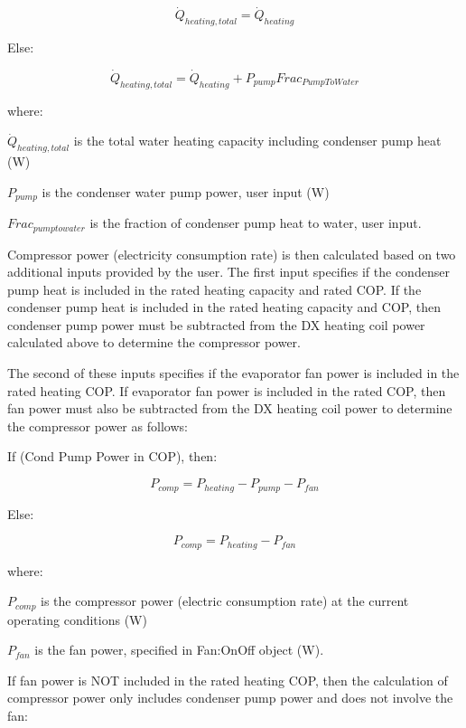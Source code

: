\begin{equation}
  \dot{Q}_{heating,total} = \dot{Q}_{heating}
\end{equation}

Else:

\begin{equation}
  \dot{Q}_{heating,total} = \dot{Q}_{heating} + P_{pump}Frac_{PumpToWater}
\end{equation}

where:

\({\dot{Q}_{heating,total}}\) is the total water heating capacity including condenser pump heat (W)

\({P_{pump}}\) is the condenser water pump power, user input (W)

\(Fra{c_{pumptowater}}\) is the fraction of condenser pump heat to water, user input.

Compressor power (electricity consumption rate) is then calculated based on two additional inputs provided by the user. The first input specifies if the condenser pump heat is included in the rated heating capacity and rated COP. If the condenser pump heat is included in the rated heating capacity and COP, then condenser pump power must be subtracted from the DX heating coil power calculated above to determine the compressor power.

The second of these inputs specifies if the evaporator fan power is included in the rated heating COP. If evaporator fan power is included in the rated COP, then fan power must also be subtracted from the DX heating coil power to determine the compressor power as follows:

If (Cond Pump Power in COP), then:

\begin{equation}
  P_{comp} = P_{heating}-P_{pump}-P_{fan}
\end{equation}

Else:

\begin{equation}
  P_{comp} = P_{heating}-P_{fan}
\end{equation}

where:

\({P_{comp}}\) is the compressor power (electric consumption rate) at the current operating conditions (W)

\({P_{fan}}\) is the fan power, specified in Fan:OnOff object (W).

If fan power is NOT included in the rated heating COP, then the calculation of compressor power only includes condenser pump power and does not involve the fan:

